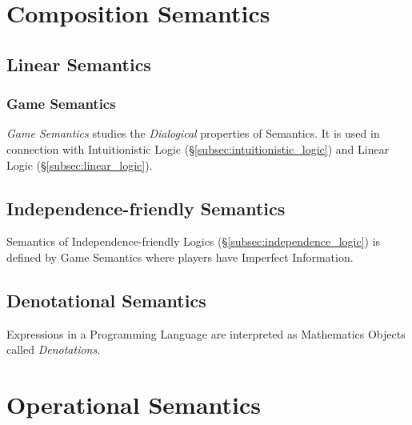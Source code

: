 \documentclass{article}
\begin{document}
\section{Composition Semantics}

\subsection{Linear Semantics}

\subsubsection{Game Semantics}

\emph{Game Semantics} studies the \emph{Dialogical} properties of
Semantics. It is used in connection with Intuitionistic Logic
(\S\ref{subsec:intuitionistic_logic}) and Linear Logic
(\S\ref{subsec:linear_logic}).

\subsection{Independence-friendly Semantics}

Semantics of Independence-friendly Logics
(\S\ref{subsec:independence_logic}) is defined by Game Semantics where
players have Imperfect Information.

\subsection{Denotational Semantics}

Expressions in a Programming Language are interpreted as Mathematics
Objects called \emph{Denotations}.



\section{Operational Semantics}
\end{document}
